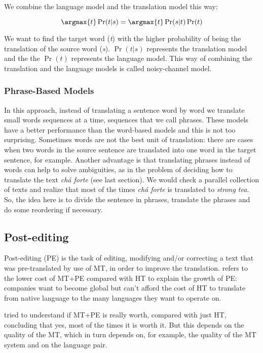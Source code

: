 We combine the language model and the translation model this way:

\begin{equation}
\argmax{t} \Pr(t|s) = \argmax{t} \Pr(s|t) \Pr(t)
\end{equation}


We want to find the target word (\textit{t}) with the higher probability of being the translation of the source word (\textit{s}). $\Pr(t|s)$ represents the translation model and the the $\Pr(t)$ represents the language model. This way of combining the translation and the language models is called noisy-channel model.

\subsubsection{Phrase-Based Models}

In this approach, instead of translating a sentence word by word we translate small words sequences at a time, sequences that we call phrases. These models have a better performance than the word-based models and this is not too surprising. Sometimes words are not the best unit of translation: there are cases when two words in the source sentence are translated into one word in the target sentence, for example. Another advantage is that translating phrases instead of words can help to solve ambiguities, as in the problem of deciding how to translate the text \textit{chá forte} (see last section). We would check a parallel collection of texts and realize that most of the times \textit{chá forte} is translated to \textit{strong tea}. So, the idea here is to divide the sentence in phrases, translate the phrases and do some reordering if necessary.

\subsection{Post-editing}

Post-editing (PE) is the task of editing, modifying and/or correcting a text that was pre-translated by use of MT, in order to improve the translation. \citep{Somers2003} refers to the lower cost of MT+PE compared with HT to explain the growth of PE: companies want to become global but can't afford the cost of HT to translate from native language to the many languages they want to operate on.

\citep{Koponen2016a} tried to understand if MT+PE is really worth, compared with just HT, concluding that yes, most of the times it is worth it. But this depends on the quality of the MT, which in turn depends on, for example, the quality of the MT system and on the language pair.

